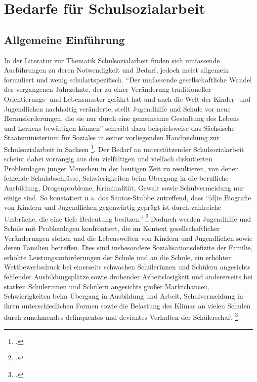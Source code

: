 \section{Bedarfe für Schulsozialarbeit}
\label{sec:BedarfeFürSchulsozialarbeit}

\subsection{Allgemeine Einführung}
\label{sec:AllgemeineEinführung}

In der Literatur zur Thematik Schulsozialarbeit finden sich umfassende Ausführungen zu deren Notwendigkeit und Bedarf, jedoch meist allgemein formuliert und wenig schulartspezifisch. "`Der umfassende gesellschaftliche Wandel der vergangenen Jahrzehnte, der zu einer Veränderung traditioneller Orientierungs- und Lebensmuster geführt hat und auch die Welt der Kinder- und Jugendlichen nachhaltig veränderte, stellt Jugendhilfe und Schule vor neue Herausforderungen, die sie nur durch eine gemeinsame Gestaltung des Lebens und Lernens bewältigen können"' schreibt dazu beispielsweise das Sächsische Staatsministerium für Soziales in seiner vorliegenden Handreichung zur Schulsozialarbeit in Sachsen \footcite[13]{SMSSS2009}. Der Bedarf an unterstützender Schulsozialarbeit scheint dabei vorrangig aus den vielfältigen und vielfach diskutierten Problemlagen junger Menschen in der heutigen Zeit zu resultieren, von denen fehlende Schulabschlüsse, Schwierigkeiten beim Übergang in die berufliche Ausbildung, Drogenprobleme, Kriminalität, Gewalt sowie Schulvermeidung nur einige sind. So konstatiert u.a. dos Santos-Stubbe zutreffend, dass "`[d]ie Biografie von Kindern und Jugendlichen gegenwärtig geprägt ist durch zahlreiche Umbrüche, die eine tiefe Bedeutung besitzen."' \footcite[68]{dosSantos-Stubbe2009} Dadurch werden Jugendhilfe und Schule mit Problemlagen konfrontiert, die im Kontext gesellschaftlicher Veränderungen stehen und die Lebenswelten von Kindern und Jugendlichen sowie deren Familien betreffen. Dies sind insbesondere Sozialisationsdefizite der Familie, erhöhte Leistungsanforderungen der Schule und an die Schule, ein erhöhter Wettbewerbsdruck bei einerseits schwachen Schülerinnen und Schülern angesichts fehlender Ausbildungsplätze sowie drohender Arbeitslosigkeit und andererseits bei starken Schülerinnen und Schülern angesichts großer Marktchancen, Schwierigkeiten beim Übergang in Ausbildung und Arbeit, Schulvermeidung in ihren unterschiedlichen Formen sowie die Belastung des Klimas an vielen Schulen durch zunehmendes delinquentes und deviantes Verhalten der Schülerschaft \footcite[vgl.][17]{SMSSS2009}.

